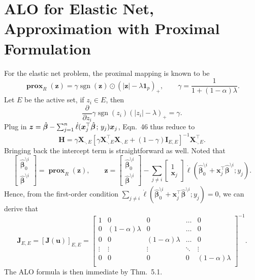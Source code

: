 \documentclass[11pt]{article}
\newcommand{\bx}{\bm{x}}
\newcommand{\bz}{\bm{z}}
\newcommand{\bH}{\bm{H}}
\newcommand{\bI}{\bm{I}}
\newcommand{\bX}{\bm{X}}
\newcommand{\bbeta}{\bm{\beta}}
\newcommand{\semicol}{\nobreak\mskip2mu\mathpunct{}\nonscript\mkern-\thinmuskip{;}\mskip6muplus1mu\relax}
\DeclareMathOperator{\sign}{sgn}
\DeclareMathOperator{\bprox}{\mathbf{prox}}
\newcommand{\refthm}[2]{#1~#2}
\begin{document}
\section{ALO for Elastic Net, Approximation with Proximal Formulation}
For the elastic net problem, the proximal mapping is known to be \[\bprox_R\left(\bz\right)=\gamma\sign(\bz)\odot(|\bz|-\lambda\bm{1}_p)_+,\qquad\gamma=\frac{1}{1+(1-\alpha)\lambda}.\] Let \(E\) be the active set, if \(z_i\in E\), then \[\frac{\partial}{\partial z_i}\gamma\sign(z_i)(|z_i|-\lambda)_+=\gamma.\] Plug in \(\bz=\hat{\bbeta}-\sum_{j=1}^{n}\dot{\ell}(\bx_j^\top\hat{\bbeta}\semicol y_j)\bx_j\), \refthm{Eqn.}{46} thus reduce to \[\bH=\gamma\bX_{\cdot,E}\left[\gamma\bX_{\cdot,E}^\top\bX_{\cdot,E}+\left(1-\gamma\right)\bI_{E,E}\right]^{-1}\bX_{\cdot,E}^\top.\]
Bringing back the intercept term is straightforward as well. Noted that \[\begin{bmatrix}
\hat{\bbeta}_0^{\setminus i} \\
\hat{\bm{\bbeta}}^{\setminus i}\end{bmatrix}=
\bprox_{R}\left(\bz\right),\qquad\bz=\begin{bmatrix}
\hat{\bbeta}_0^{\setminus i} \\
\hat{\bm{\bbeta}}^{\setminus i}\end{bmatrix}-
\sum_{j\neq i}\begin{bmatrix}
1 \\
\bm{x}_j\end{bmatrix}
\dot{\ell}\left(\hat{\bbeta}_0^{\setminus i}+\bm{x}_j^\top\hat{\bm{\bbeta}}^{\setminus i};y_j\right).\] Hence, from the first-order condition \(\sum_{j\neq i}\dot{\ell}\left(\hat{\bbeta}_0^{\setminus i}+\bm{x}_j^\top\hat{\bm{\bbeta}}^{\setminus i};y_j\right)=0\), we can derive that \[\bm{J}_{E,E}=
\left[\bm{J}(\bm{u})\right]_{E,E}=
\begin{bmatrix}
1 & 0 & 0 & \dots & 0\\
0 & (1-\alpha)\lambda & 0 & \dots & 0\\
0 & 0 & (1-\alpha)\lambda & \dots & 0\\
\vdots & \vdots & \vdots & \ddots & \vdots\\
0 & 0 & 0 & 0 & (1-\alpha)\lambda\\
\end{bmatrix}^{-1}.\] The ALO formula is then immediate by \refthm{Thm.}{5.1}.
\end{document}
